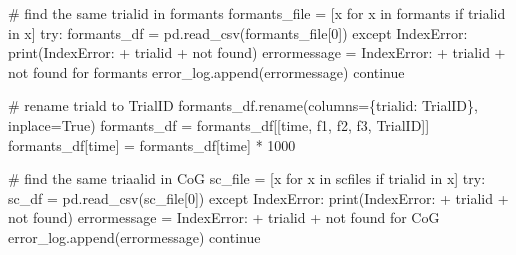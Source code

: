 \documentclass[
  letterpaper,
  DIV=11,
  numbers=noendperiod]{scrreprt}
\newenvironment{Shaded}{\begin{snugshade}}{\end{snugshade}}
\newcommand{\BuiltInTok}[1]{\textcolor[rgb]{0.00,0.23,0.31}{#1}}
\newcommand{\CommentTok}[1]{\textcolor[rgb]{0.37,0.37,0.37}{#1}}
\newcommand{\ControlFlowTok}[1]{\textcolor[rgb]{0.00,0.23,0.31}{#1}}
\newcommand{\DecValTok}[1]{\textcolor[rgb]{0.68,0.00,0.00}{#1}}
\newcommand{\KeywordTok}[1]{\textcolor[rgb]{0.00,0.23,0.31}{#1}}
\newcommand{\NormalTok}[1]{\textcolor[rgb]{0.00,0.23,0.31}{#1}}
\newcommand{\OperatorTok}[1]{\textcolor[rgb]{0.37,0.37,0.37}{#1}}
\newcommand{\PreprocessorTok}[1]{\textcolor[rgb]{0.68,0.00,0.00}{#1}}
\newcommand{\StringTok}[1]{\textcolor[rgb]{0.13,0.47,0.30}{#1}}
\newcommand{\VariableTok}[1]{\textcolor[rgb]{0.07,0.07,0.07}{#1}}
\begin{document}
\begin{Shaded}
\begin{Highlighting}[]
    \CommentTok{\# find the same trialid in formants}
\NormalTok{    formants\_file }\OperatorTok{=}\NormalTok{ [x }\ControlFlowTok{for}\NormalTok{ x }\KeywordTok{in}\NormalTok{ formants }\ControlFlowTok{if}\NormalTok{ trialid }\KeywordTok{in}\NormalTok{ x]}
    \ControlFlowTok{try}\NormalTok{:}
\NormalTok{        formants\_df }\OperatorTok{=}\NormalTok{ pd.read\_csv(formants\_file[}\DecValTok{0}\NormalTok{])}
    \ControlFlowTok{except} \PreprocessorTok{IndexError}\NormalTok{:}
        \BuiltInTok{print}\NormalTok{(}\StringTok{\textquotesingle{}IndexError: \textquotesingle{}} \OperatorTok{+}\NormalTok{ trialid }\OperatorTok{+} \StringTok{\textquotesingle{}not found\textquotesingle{}}\NormalTok{)}
\NormalTok{        errormessage }\OperatorTok{=} \StringTok{\textquotesingle{}IndexError: \textquotesingle{}} \OperatorTok{+}\NormalTok{ trialid }\OperatorTok{+} \StringTok{\textquotesingle{} not found for formants\textquotesingle{}}
\NormalTok{        error\_log.append(errormessage)}
        \ControlFlowTok{continue}

    \CommentTok{\# rename triald to TrialID}
\NormalTok{    formants\_df.rename(columns}\OperatorTok{=}\NormalTok{\{}\StringTok{\textquotesingle{}trialid\textquotesingle{}}\NormalTok{: }\StringTok{\textquotesingle{}TrialID\textquotesingle{}}\NormalTok{\}, inplace}\OperatorTok{=}\VariableTok{True}\NormalTok{)}
\NormalTok{    formants\_df }\OperatorTok{=}\NormalTok{ formants\_df[[}\StringTok{\textquotesingle{}time\textquotesingle{}}\NormalTok{, }\StringTok{\textquotesingle{}f1\textquotesingle{}}\NormalTok{, }\StringTok{\textquotesingle{}f2\textquotesingle{}}\NormalTok{, }\StringTok{\textquotesingle{}f3\textquotesingle{}}\NormalTok{, }\StringTok{\textquotesingle{}TrialID\textquotesingle{}}\NormalTok{]]}
\NormalTok{    formants\_df[}\StringTok{\textquotesingle{}time\textquotesingle{}}\NormalTok{] }\OperatorTok{=}\NormalTok{ formants\_df[}\StringTok{\textquotesingle{}time\textquotesingle{}}\NormalTok{] }\OperatorTok{*} \DecValTok{1000}

    \CommentTok{\# find the same triaalid in CoG}
\NormalTok{    sc\_file }\OperatorTok{=}\NormalTok{ [x }\ControlFlowTok{for}\NormalTok{ x }\KeywordTok{in}\NormalTok{ scfiles }\ControlFlowTok{if}\NormalTok{ trialid }\KeywordTok{in}\NormalTok{ x]}
    \ControlFlowTok{try}\NormalTok{:}
\NormalTok{        sc\_df }\OperatorTok{=}\NormalTok{ pd.read\_csv(sc\_file[}\DecValTok{0}\NormalTok{])}
    \ControlFlowTok{except} \PreprocessorTok{IndexError}\NormalTok{:}
        \BuiltInTok{print}\NormalTok{(}\StringTok{\textquotesingle{}IndexError: \textquotesingle{}} \OperatorTok{+}\NormalTok{ trialid }\OperatorTok{+} \StringTok{\textquotesingle{}not found\textquotesingle{}}\NormalTok{)}
\NormalTok{        errormessage }\OperatorTok{=} \StringTok{\textquotesingle{}IndexError: \textquotesingle{}} \OperatorTok{+}\NormalTok{ trialid }\OperatorTok{+} \StringTok{\textquotesingle{} not found for CoG\textquotesingle{}}
\NormalTok{        error\_log.append(errormessage)}
        \ControlFlowTok{continue}


\end{Highlighting}
\end{Shaded}
\end{document}
